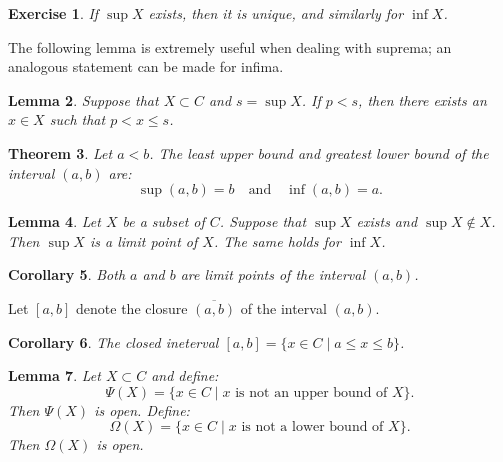 \documentclass{amsart}
\newtheorem{theorem}{Theorem}
\newtheorem{lemma}[theorem]{Lemma}
\newtheorem{corollary}[theorem]{Corollary}
\newtheorem{exercise}[theorem]{Exercise}
\newcommand{\1}{\mathds{1}}
\numberwithin{equation}{section}
\numberwithin{theorem}{section}
\begin{document}

\begin{exercise}  If $\sup X$ exists, then it is unique, and similarly for $\inf X$.
\end{exercise}







The following lemma is extremely useful when dealing with suprema; an analogous statement can be made for infima.
\begin{lemma} 
\label{lem1}
Suppose that $X \subset C$ and $s = \sup X$.
If $p<s$, then there exists an $x\in X$ such that $p < x \le s$.
\end{lemma} 


\begin{theorem}  Let $a < b$.  The least upper bound and greatest lower bound of the interval $(a,b)$ are:
\[
\sup (a,b) = b \quad \text{and} \quad \inf (a,b) = a.
\]
\end{theorem}




\begin{lemma}  
Let $X$ be a subset of $C$.
Suppose that $\sup X$ exists and $\sup X \notin X$.  Then $\sup X$ is a limit point of $X$.  The same holds for $\inf X$.
\end{lemma} 

\begin{corollary}  Both $a$ and $b$ are limit points of the interval $(a,b)$.
\end{corollary}

Let $[a, b]$ denote the closure $\overline{(a,b)}$ of the interval $(a,b)$.  

\begin{corollary}
The closed ineterval $[a, b] = \{x \in C \mid a \leq x \leq b  \}$.
\end{corollary}



\begin{lemma}  Let $X \subset C$ and define:
\[
\Psi(X) = \{ x \in C \mid \text{$x$ is not an upper bound of $X$} \}.
\]
Then $\Psi(X)$ is open.
Define:
\[
\Omega(X) = \{ x \in C \mid \text{$x$ is not a lower bound of $X$} \}.
\]
Then $\Omega(X)$ is open.
\end{lemma}
\end{document}
